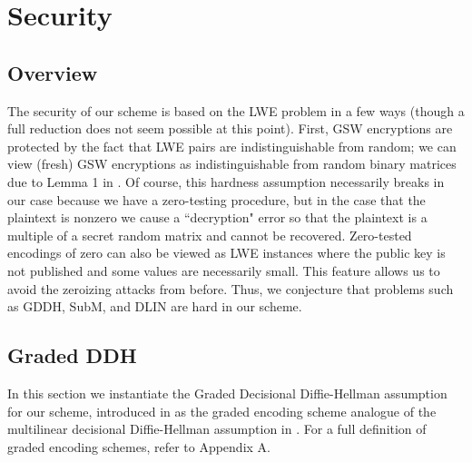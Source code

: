 \section{Security}

\subsection{Overview}

The security of our scheme is based on the LWE problem in a few ways (though a full reduction does not seem possible at this point).  First, GSW encryptions are protected by the fact that LWE pairs are indistinguishable from random; we can view (fresh) GSW encryptions as indistinguishable from random binary matrices due to Lemma 1 in \cite{gsw}.  Of course, this hardness assumption necessarily breaks in our case because we have a zero-testing procedure, but in the case that the plaintext is nonzero we cause a ``decryption" error so that the plaintext is a multiple of a secret random matrix and cannot be recovered.  Zero-tested encodings of zero can also be viewed as LWE instances where the public key is not published and some values are necessarily small.  This feature allows us to avoid the zeroizing attacks from before.  Thus, we conjecture that problems such as GDDH, SubM, and DLIN are hard in our scheme.

\subsection{Graded DDH}
In this section we instantiate the Graded Decisional Diffie-Hellman assumption for our scheme, introduced in \cite{ggh13a} as the graded encoding scheme analogue of the multilinear decisional Diffie-Hellman assumption in \cite{bs}.  For a full definition of graded encoding schemes, refer to Appendix A.

